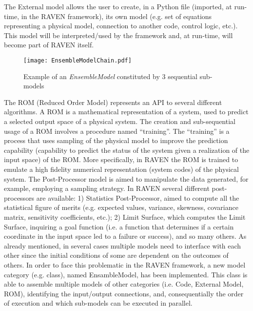 The External model allows the user to create, in a Python file (imported, at run-time, in 
the RAVEN framework), its own model (e.g. set of equations representing a 
physical model, connection to another code, control logic, etc.). This model will be 
interpreted/used by the framework and, at run-time, will become part of RAVEN 
itself.
\begin{figure}
    \centering
    \texttt{[image: EnsembleModelChain.pdf]}
    \caption{Example of an \textit{EnsembleModel} constituted by 3 sequential sub-models}
    \label{fig:ensembleModelChain}
\end{figure}
The ROM (Reduced Order Model) represents an API to several different algorithms. A 
ROM is a mathematical representation of a system, used to predict a selected 
output space of a physical system. The creation and sub-sequential usage of a ROM 
involves a procedure named ``training''. The ``training'' is a process that uses 
sampling of the physical model to improve the prediction capability (capability to predict 
the status of the system given a realization of the input space) of the ROM. 
More specifically, in RAVEN the ROM is trained to emulate a high fidelity numerical 
representation (system codes) of the physical system.
The Post-Processor model is aimed to manipulate the data generated, for example, 
employing a sampling strategy. In RAVEN several different post-processors are 
available: 1) Statistics Post-Processor, aimed to compute all the statistical figure of 
merits (e.g. expected values, variance, skewness, covariance matrix, sensitivity 
coefficients, etc.); 2) Limit Surface, which computes the Limit Surface, inquiring a goal 
function (i.e. a function that determines if a certain coordinate in the input space 
led to a failure or success), and so many others.
As already mentioned, in several cases multiple models need to interface with each 
other since the initial conditions of some are dependent on the outcomes of others. 
In order to face this problematic in the RAVEN framework, a new model category (e.g. 
class), named EnsambleModel, has been implemented. This class is able to 
assemble multiple models of other categories (i.e. Code, External Model, ROM), 
identifying the input/output connections, and, consequentially the order of execution 
and which sub-models can be executed in parallel.

